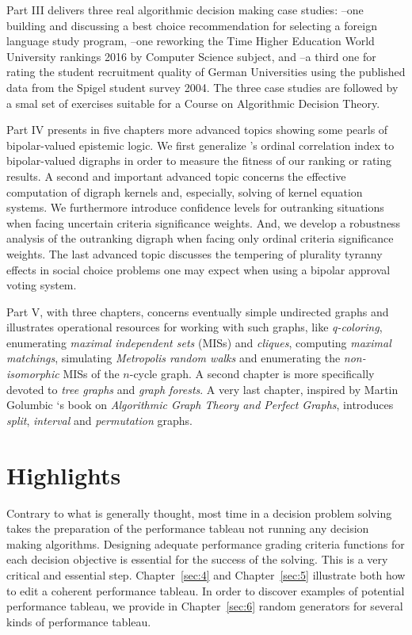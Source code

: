 Part III delivers three real algorithmic decision making case studies: --one building and discussing a best choice recommendation for selecting a foreign language study program, --one reworking the Time Higher Education World University rankings 2016 by Computer Science subject, and --a third one for rating the student recruitment quality of German Universities using the published data from the Spigel student survey 2004. The three case studies are followed by a smal set of exercises suitable for a Course on Algorithmic Decision Theory.

Part IV presents in five chapters more advanced topics showing some pearls of bipolar-valued epistemic logic. We first generalize \Kendall 's ordinal correlation index to bipolar-valued digraphs in order to measure the fitness of our ranking or rating results. A second and important advanced topic concerns the effective computation of digraph kernels and, especially, solving of \Berge kernel equation systems. We furthermore introduce confidence levels for outranking situations when facing uncertain criteria significance weights. And, we develop a robustness analysis of the outranking digraph when facing only ordinal criteria significance weights. The last advanced topic discusses the tempering of plurality tyranny effects in social choice problems one may expect when using a bipolar approval voting system. 

Part V, with three chapters, concerns eventually simple undirected graphs and illustrates operational resources for working with such graphs, like \emph{q-coloring}, enumerating\emph{ maximal independent sets} (MISs) and \emph{cliques}, computing \emph{maximal matchings}, simulating \emph{Metropolis random walks} and enumerating the \emph{non-isomorphic} MISs of the $n$-cycle graph. A second chapter is more specifically devoted to \emph{tree graphs} and \emph{graph forests}. A very last chapter, inspired by Martin Golumbic ‘s book on \emph{Algorithmic Graph Theory and Perfect Graphs}, introduces \emph{split}, \emph{interval} and \emph{permutation} graphs.

\section{Highlights}
\label{asec:0.1}

Contrary to what is generally thought, most time in a decision problem solving takes the preparation of the performance tableau not running any decision making algorithms. Designing adequate performance grading criteria functions for each decision objective is essential for the success of the solving. This is a very critical and essential step. Chapter~\ref{sec:4} and Chapter~\ref{sec:5} illustrate both how to edit a coherent performance tableau. In order to discover examples of potential performance tableau, we provide in Chapter~\ref{sec:6} random generators for several kinds of performance tableau. 

